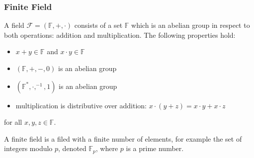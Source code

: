 \subsubsection{Finite Field}
A field $\mathcal{F} = (\mathbb{F}, +, \cdot)$ consists of a set $\mathbb{F}$ which is an abelian group in respect to both operations: addition and multiplication. The following properties hold:
\begin{itemize}
    \item $x + y \in \mathbb{F}$ and $x \cdot y \in \mathbb{F}$
    \item $(\mathbb{F}, +, -, 0)$ is an abelian group
    \item $(\mathbb{F}^*, \cdot, ^{-1}, 1)$ is an abelian group
    \item multiplication is distributive over addition: $x \cdot (y + z) = x \cdot y + x \cdot z$
\end{itemize}
for all $x, y, z \in \mathbb{F}$.

A finite field is a filed with a finite number of elements, for example the set of integers modulo $p$, denoted $\mathbb{F}_p$, where $p$ is a prime number.

